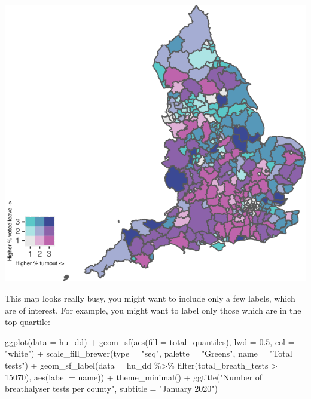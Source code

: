 \documentclass[
]{book}
\newenvironment{Shaded}{\begin{snugshade}}{\end{snugshade}}
\newcommand{\AttributeTok}[1]{\textcolor[rgb]{0.77,0.63,0.00}{#1}}
\newcommand{\DecValTok}[1]{\textcolor[rgb]{0.00,0.00,0.81}{#1}}
\newcommand{\FloatTok}[1]{\textcolor[rgb]{0.00,0.00,0.81}{#1}}
\newcommand{\FunctionTok}[1]{\textcolor[rgb]{0.00,0.00,0.00}{#1}}
\newcommand{\NormalTok}[1]{#1}
\newcommand{\SpecialCharTok}[1]{\textcolor[rgb]{0.00,0.00,0.00}{#1}}
\newcommand{\StringTok}[1]{\textcolor[rgb]{0.31,0.60,0.02}{#1}}
\begin{document}
\includegraphics{crime_mapping_files/figure-latex/unnamed-chunk-151-1.pdf}

This map looks really busy, you might want to include only a few labels, which are of interest. For example, you might want to label only those which are in the top quartile:

\begin{Shaded}
\begin{Highlighting}[]
\FunctionTok{ggplot}\NormalTok{(}\AttributeTok{data =}\NormalTok{ hu\_dd) }\SpecialCharTok{+} 
  \FunctionTok{geom\_sf}\NormalTok{(}\FunctionTok{aes}\NormalTok{(}\AttributeTok{fill =}\NormalTok{ total\_quantiles), }\AttributeTok{lwd =} \FloatTok{0.5}\NormalTok{, }\AttributeTok{col =} \StringTok{"white"}\NormalTok{) }\SpecialCharTok{+} 
  \FunctionTok{scale\_fill\_brewer}\NormalTok{(}\AttributeTok{type =} \StringTok{"seq"}\NormalTok{, }\AttributeTok{palette =} \StringTok{"Greens"}\NormalTok{, }\AttributeTok{name =} \StringTok{"Total tests"}\NormalTok{) }\SpecialCharTok{+} 
  \FunctionTok{geom\_sf\_label}\NormalTok{(}\AttributeTok{data =}\NormalTok{ hu\_dd }\SpecialCharTok{\%\textgreater{}\%} \FunctionTok{filter}\NormalTok{(total\_breath\_tests }\SpecialCharTok{\textgreater{}=} \DecValTok{15070}\NormalTok{), }\FunctionTok{aes}\NormalTok{(}\AttributeTok{label =}\NormalTok{ name)) }\SpecialCharTok{+} 
  \FunctionTok{theme\_minimal}\NormalTok{() }\SpecialCharTok{+} 
  \FunctionTok{ggtitle}\NormalTok{(}\StringTok{"Number of breathalyser tests per county"}\NormalTok{, }\AttributeTok{subtitle =} \StringTok{"January 2020"}\NormalTok{)}
\end{Highlighting}
\end{Shaded}
\end{document}
